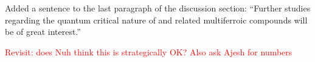 \begin{changesmade}
Added a sentence to the last paragraph of the discussion section: ``Further studies regarding the quantum critical nature of  and related multiferroic compounds will be of great interest.''
\end{changesmade}

\textcolor{red}{Revisit: does Nuh think this is strategically OK? Also ask Ajesh for numbers}


